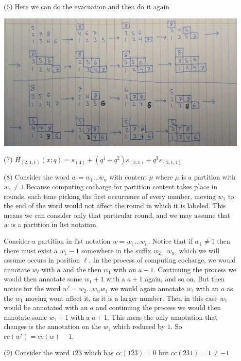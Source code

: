 \documentclass[12pt]{amsart}
\begin{document}
\begin{itemize}
    \item[(6)] 
    Here we can do the evacuation and then do it again
    
    \includegraphics[scale=.1]{hwb-2.jpg}


    \item[(7)]
    $\tilde{H}_{(2,1,1)}(x;q)=s_{(4)}+(q^1+q^2)s_{(3,1)}+q^3s_{(2,1,1)}$
    \item[(8)]
    Consider the word $w=w_1\dots w_n$ with content $\mu$ where $\mu$ is a partition with $w_1\neq 1$
    Because computing cocharge for partition content takes place in rounds, each time 
    picking the first occurrence of every number, 
    moving $w_1$ to the end of the word would not affect the round in which it is labeled. This 
    means we can consider only that particular round, 
    and we may assume that $w$ is a partition in list notation.

    Consider a partition in list notation $w=w_1\dots w_n$.
    Notice that if $w_1\neq 1$ then there must exist a $w_1-1$ somewhere in the suffix
    $w_2\dots w_n$, which we will assume occurs in position $\ell$. In the process of 
    computing cocharge, we would annotate $w_\ell$ with $a$ and the then ${w_1}$ with an $a+1$.
    Continuing the process we would then annotate some $w_1+1$ with a $a+1$ again, and so on.
    But then notice for the word $w'=w_2\dots w_n w_1$ we would again annotate $w_\ell$ with an $a$ as 
    the $w_1$ moving wont affect it, as it is a larger number. Then in this case $w_1$ would be annotated
    with an $a$ and continuing the process we would then annotate some $w_1+1$ with a $a+1$. This 
    meas the only annotation that changes is the annotation on the $w_1$ which reduced by $1$.
    So $cc(w')=cc(w)-1$.\\
    \item[(9)]
    Consider the word $123$ which has $cc(123)=0$ but $cc(231)=1\neq -1$
\end{itemize}
\end{document}
